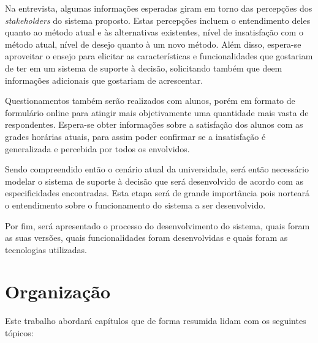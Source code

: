 Na entrevista, algumas informações esperadas giram em torno das percepções dos \textit{stakeholders} do sistema proposto. Estas percepções incluem o entendimento deles quanto ao método atual e às alternativas existentes, nível de insatisfação com o método atual, nível de desejo quanto à um novo método. Além disso, espera-se aproveitar o ensejo para elicitar as características e funcionalidades que gostariam de ter em um sistema de suporte à decisão, solicitando também que deem informações adicionais que gostariam de acrescentar.

Questionamentos também serão realizados com alunos, porém em formato de formulário online para atingir mais objetivamente uma quantidade mais vasta de respondentes. Espera-se obter informações sobre a satisfação dos alunos com as grades horárias atuais, para assim poder confirmar se a insatisfação é generalizada e percebida por todos os envolvidos.

Sendo compreendido então o cenário atual da universidade, será então necessário modelar o sistema de suporte à decisão que será desenvolvido de acordo com as especificidades encontradas. Esta etapa será de grande importância pois norteará o entendimento sobre o funcionamento do sistema a ser desenvolvido.

Por fim, será apresentado o processo do desenvolvimento do sistema, quais foram as suas versões, quais funcionalidades foram desenvolvidas e quais foram as tecnologias utilizadas.

\section{Organização} \label{sec:Organização}            %

Este trabalho abordará capítulos que de forma resumida lidam com os seguintes tópicos:

